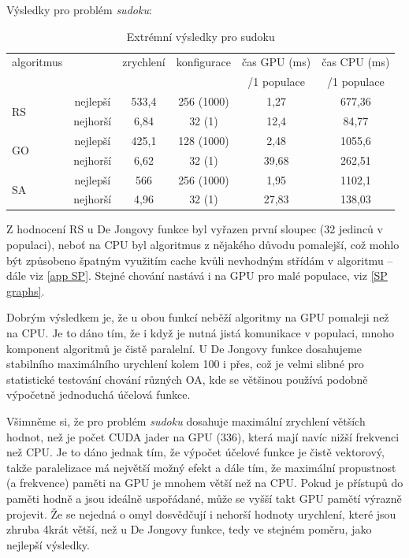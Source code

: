 Výsledky pro problém \emph{sudoku}:

\begin{table}[h]
    \begin{center}
    \begin{tabular}{lccccc}
      \toprule
      algoritmus &  & zrychlení & konfigurace & čas GPU (ms) & čas CPU (ms) \\
      & & & & /1 populace & /1 populace \\
      \midrule
      \multirow{2}{*}{RS} & nejlepší & 533,4 & 256 (1000) & 1,27 & 677,36\\
                        & nejhorší & 6,84 & 32 (1) & 12,4 & 84,77\\
      \multirow{2}{*}{GO} & nejlepší & 425,1 & 128 (1000) & 2,48 & 1055,6\\
                         & nejhorší & 6,62 & 32 (1) & 39,68 & 262,51 \\
      \multirow{2}{*}{SA} & nejlepší & 566 & 256 (1000) & 1,95 & 1102,1\\
                        & nejhorší & 4,96 & 32 (1) & 27,83 & 138,03\\
                       
      \bottomrule
    \end{tabular}
    \caption{Extrémní výsledky pro sudoku}
    \end{center}
\end{table}

Z hodnocení RS u De Jongovy funkce byl vyřazen první sloupec (32 jedinců v populaci), neboť na CPU byl algoritmus z nějakého důvodu pomalejší, což mohlo být způsobeno špatným využitím cache kvůli nevhodným střídám v algoritmu -- dále viz \ref{app SP}. Stejné chování nastává i na GPU pro malé populace, viz \ref{SP graphs}.

Dobrým výsledkem je, že u obou funkcí neběží algoritmy na GPU pomaleji než na CPU. Je to dáno tím, že i když je nutná jistá komunikace v populaci, mnoho komponent algoritmů je čistě paralelní. U De Jongovy funkce dosahujeme stabilního maximálního urychlení kolem 100 i přes, což je velmi slibné pro statistické testování chování různých OA, kde se většinou používá podobně výpočetně jednoduchá účelová funkce.

Všimněme si, že pro problém \emph{sudoku} dosahuje maximální zrychlení větších hodnot, než je počet CUDA jader na GPU (336), která mají navíc nižší frekvenci než CPU. Je to dáno jednak tím, že výpočet účelové funkce je čistě vektorový, takže paralelizace má největší možný efekt a dále tím, že maximální propustnost (a frekvence) paměti na GPU je mnohem větší než na CPU. Pokud je přístupů do paměti hodně a jsou ideálně uspořádané, může se vyšší takt GPU pamětí výrazně projevit. Že se nejedná o omyl dosvědčují i nehorší hodnoty urychlení, které jsou zhruba 4krát větší, než u De Jongovy funkce, tedy ve stejném poměru, jako nejlepší výsledky.


